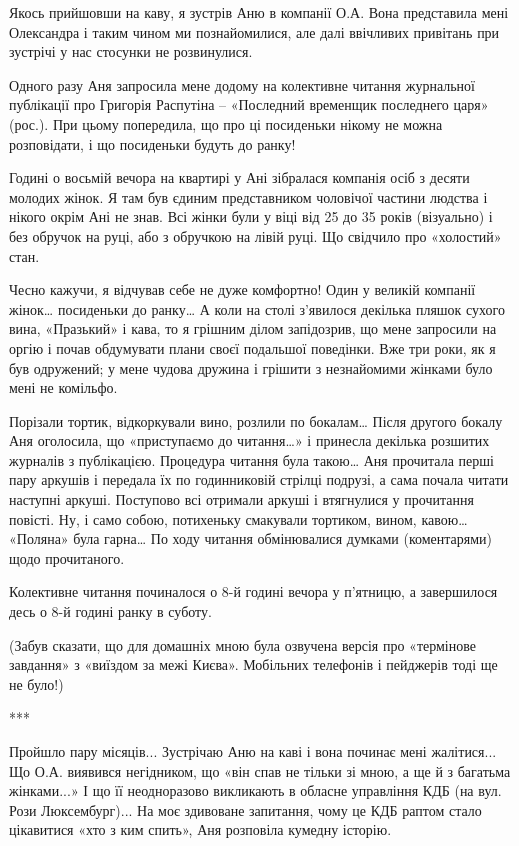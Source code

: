 Якось прийшовши на каву, я зустрів Аню в компанії О.А. Вона представила мені
Олександра і таким чином ми познайомилися, але далі ввічливих привітань при
зустрічі у нас стосунки не розвинулися. 

Одного разу Аня запросила мене додому на колективне читання журнальної
публікації про Григорія Распутіна – «Последний временщик последнего царя»
(рос.). При цьому попередила, що про ці посиденьки нікому не можна розповідати,
і що посиденьки будуть до ранку!

Годині о восьмій вечора на квартирі у Ані зібралася компанія осіб з десяти
молодих жінок. Я там був єдиним представником чоловічої частини людства і
нікого окрім Ані не знав. Всі жінки були у віці від 25 до 35 років (візуально)
і без обручок на руці, або з обручкою на лівій руці. Що свідчило про «холостий»
стан. 

Чесно кажучи, я відчував себе не дуже комфортно! Один у великій компанії жінок…
посиденьки до ранку… А коли на столі з’явилося декілька пляшок сухого вина,
«Празький» і кава, то я грішним ділом запідозрив, що мене запросили на оргію і
почав обдумувати плани своєї подальшої поведінки. Вже три роки, як я був
одружений; у мене чудова дружина і грішити з незнайомими жінками було мені не
комільфо.

Порізали тортик, відкоркували вино, розлили по бокалам… Після другого бокалу
Аня оголосила, що «приступаємо до читання…» і принесла декілька розшитих
журналів з публікацією. Процедура читання була такою… Аня прочитала перші пару
аркушів і передала їх по годинниковій стрілці подрузі, а сама почала читати
наступні аркуші. Поступово всі отримали аркуші і втягнулися у прочитання
повісті. Ну, і само собою, потихеньку смакували тортиком, вином, кавою…
«Поляна» була гарна… По ходу читання обмінювалися думками (коментарями) щодо
прочитаного.

Колективне читання починалося о 8-й годині вечора у п’ятницю, а завершилося
десь о 8-й годині ранку в суботу. 

(Забув сказати, що для домашніх мною була озвучена версія про «термінове
завдання» з «виїздом за межі Києва». Мобільних телефонів і пейджерів тоді ще не
було!)

***

Пройшло пару місяців... Зустрічаю Аню на каві і вона починає мені жалітися... Що
О.А. виявився негідником, що «він спав не тільки зі мною, а ще й з багатьма
жінками...» І що її неодноразово викликають в обласне управління КДБ (на вул.
Рози Люксембург)... На моє здивоване запитання, чому це КДБ раптом стало
цікавитися «хто з ким спить», Аня розповіла кумедну історію.

